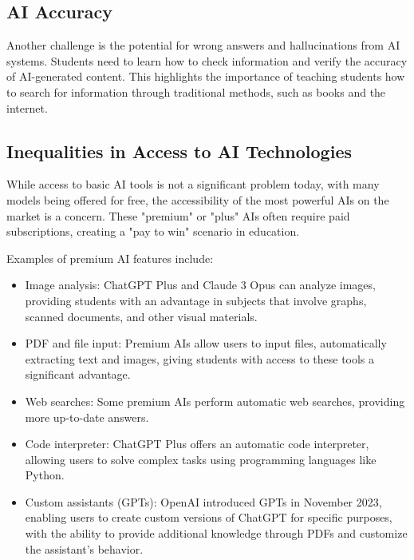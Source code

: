 \documentclass{article}
\begin{document}

\subsection{AI Accuracy}

Another challenge is the potential for wrong answers and hallucinations from AI systems. Students need to learn how to check information and verify the accuracy of AI-generated content. This highlights the importance of teaching students how to search for information through traditional methods, such as books and the internet.

\subsection{Inequalities in Access to AI Technologies}

While access to basic AI tools is not a significant problem today, with many models being offered for free, the accessibility of the most powerful AIs on the market is a concern. These "premium" or "plus" AIs often require paid subscriptions, creating a "pay to win" scenario in education.

Examples of premium AI features include:

\begin{itemize}
    \item Image analysis: ChatGPT Plus and Claude 3 Opus can analyze images, providing students with an advantage in subjects that involve graphs, scanned documents, and other visual materials.
    \item PDF and file input: Premium AIs allow users to input files, automatically extracting text and images, giving students with access to these tools a significant advantage.
    \item Web searches: Some premium AIs perform automatic web searches, providing more up-to-date answers.
    \item Code interpreter: ChatGPT Plus offers an automatic code interpreter, allowing users to solve complex tasks using programming languages like Python.
    \item Custom assistants (GPTs): OpenAI introduced GPTs in November 2023, enabling users to create custom versions of ChatGPT for specific purposes, with the ability to provide additional knowledge through PDFs and customize the assistant's behavior.
\end{itemize}
\end{document}
